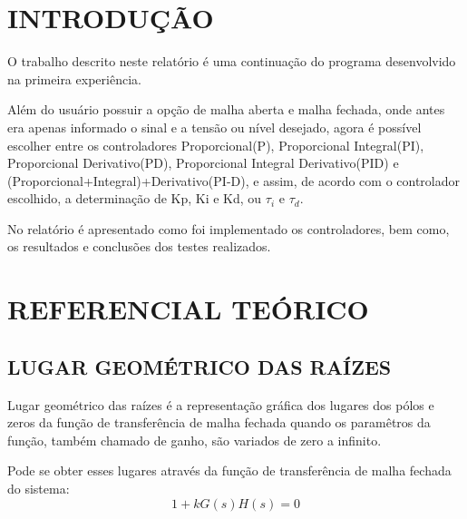\documentclass[a4paper,12pt]{article}
\begin{document}

\thispagestyle{main}

\section{INTRODUÇÃO}

\begin{flushleft}
\hspace{4ex}O trabalho descrito neste relatório é uma continuação do programa desenvolvido na primeira experiência.

\hspace{4ex}Além do usuário possuir a opção de malha aberta e malha fechada, onde antes era apenas informado o sinal e a tensão ou nível desejado, agora é possível escolher entre os controladores Proporcional(P), Proporcional Integral(PI), Proporcional Derivativo(PD), Proporcional Integral Derivativo(PID) e (Proporcional+Integral)+Derivativo(PI-D), e assim, de acordo com o controlador escolhido, a determinação de Kp, Ki e Kd, ou    $\tau_i$ e $\tau_d.$

\hspace{4ex}No relatório é apresentado como foi implementado os controladores, bem como, os resultados e conclusões dos testes realizados.
\end{flushleft}

\newpage


\thispagestyle{main}

\section{REFERENCIAL TEÓRICO}

\subsection{LUGAR GEOMÉTRICO DAS RAÍZES}
\hspace{4ex}Lugar geométrico das raízes é a representação gráfica dos lugares dos pólos e zeros da função de transferência de malha fechada quando os paramêtros da função, também chamado de ganho, são variados de zero a infinito.
 
Pode se obter esses lugares através da função de transferência de malha fechada do sistema:
\begin{equation}\label{eq:1}
1 + kG(s)H(s) = 0
\end{equation}
\end{document}

